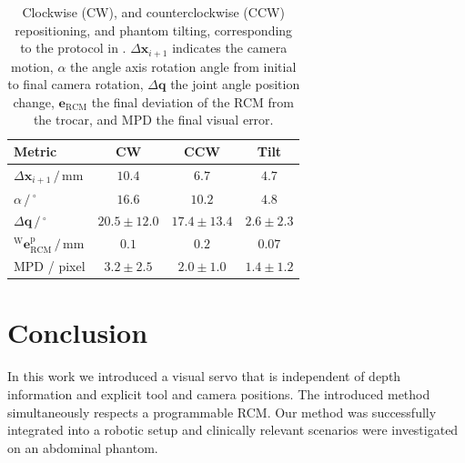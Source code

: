\begin{table}
\centering
\caption{Clockwise (CW), and counterclockwise (CCW) repositioning, and phantom tilting, corresponding to the protocol in . $\Delta\mathbf{x}_{i+1}$ indicates the camera motion, $\alpha$ the angle axis rotation angle from initial to final camera rotation, $\Delta\mathbf{q}$ the joint angle position change, $\mathbf{e}_\text{RCM}$ the final deviation of the RCM from the trocar, and MPD the final visual error.}
\begin{tabular}{lccc}
    \toprule
     Metric & CW & CCW & Tilt \\
     \hline
     $\Delta\mathbf{x}_{i+1}\,/\,\text{mm}$ & $10.4$ & $6.7$ & $4.7$ \\
     \hline
     $\alpha\,/\,^\circ$ & $16.6$ & $10.2$ & $4.8$ \\
     \hline
     $\Delta\mathbf{q}\,/\,^\circ$ & $20.5\pm12.0$ & $17.4\pm13.4$ & $2.6 \pm 2.3$ \\
     \hline
     $^\text{W}\mathbf{e}^\text{p}_\text{RCM}\,/\,\text{mm}$& $0.1$ & $0.2$ & $0.07$ \\
     \hline
     MPD / pixel & $3.2\pm2.5$ & $2.0\pm1.0$ & $1.4\pm1.2$ \\
     \bottomrule
\end{tabular}
\label{c2:tab:repositioning}
\end{table}
%    

\section{Conclusion}
\label{c2:sec:conclusions}
In this work we introduced a visual servo that is independent of depth information and explicit tool and camera positions. The introduced method simultaneously respects a programmable RCM. Our method was successfully integrated into a robotic setup and clinically relevant scenarios were investigated on an abdominal phantom.

